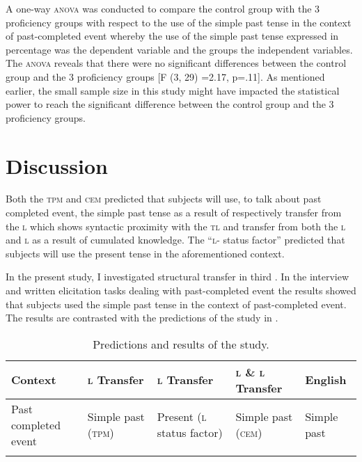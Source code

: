 \documentclass[output=paper,
modfonts
]{langscibook}
\begin{document}
A one-way \textsc{anova} was conducted to compare the control group with the 3 proficiency groups with respect to the use of the simple past tense in the context of past-completed event whereby the use of the simple past tense expressed in percentage was the dependent variable and the groups the independent variables. The \textsc{anova} reveals that there were no significant differences between the control group and the 3 proficiency groups [F (3, 29) =2.17, p=.11]. As mentioned earlier, the small sample size in this study might have impacted the statistical power to reach the significant difference between the control group and the 3 proficiency groups.

\section{Discussion}\label{sec:kabasele:7}

Both the \textsc{tpm} and \textsc{cem} predicted that subjects will use, to talk about past completed event, the simple past tense as a result of respectively transfer from the \textsc{l} which shows syntactic proximity with the \textsc{tl} and transfer from both the \textsc{l} and \textsc{l} as a result of cumulated knowledge. The “\textsc{l}- status factor” predicted that subjects will use the present  tense in the aforementioned context. 

In the present study, I investigated structural transfer in third . In the interview and written elicitation tasks dealing with past-completed event the results showed that subjects used the simple past tense in the context of past-completed event. The results are contrasted with the predictions of the study in .

\begin{table}
\small
\begin{tabularx}{\textwidth}{QQQQl}
\lsptoprule
{\bfseries Context} & {\bfseries \textsc{l} Transfer} & {\bfseries \textsc{l} Transfer} & {\bfseries \textsc{l} \& \textsc{l} Transfer} & {\bfseries English}\\
\midrule
{ Past completed event} & { Simple past (\textsc{tpm})} & { Present  (\textsc{l} status factor)} & { Simple past (\textsc{cem})} & { Simple past}\\
\lspbottomrule
\end{tabularx}
\caption{Predictions and results of the study.}
\label{tab:kabasele:5}
\end{table}
\end{document}

